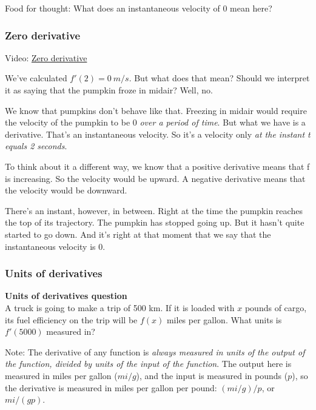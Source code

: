 \documentclass[pdftex, brazil, 12pt, twoside]{article}
\begin{document}
Food for thought: What does an instantaneous velocity of 0 mean here?

\subsubsection{Zero derivative}
\label{u1-what-zero-derivative}

Video: \href{https://www.youtube.com/watch?v=CA56Y0HTb6c}{Zero derivative}

We've calculated $f'(2) = 0\ m/s$.
But what does that mean?
Should we interpret it as saying that the pumpkin froze
in midair?
Well, no.

We know that pumpkins don't behave like that.
Freezing in midair would require the velocity of the pumpkin
to be 0 \emph{over a period of time}.
But what we have is a derivative.
That's an instantaneous velocity.
So it's a velocity only \emph{at the instant t equals 2 seconds}.

To think about it a different way,
we know that a positive derivative
means that f is increasing.
So the velocity would be upward.
A negative derivative means that the velocity would be downward.

There's an instant, however, in between.
Right at the time the pumpkin reaches
the top of its trajectory.
The pumpkin has stopped going up.
But it hasn't quite started to go down.
And it's right at that moment that we
say that the instantaneous velocity is 0.

\subsubsection{Units of derivatives}
\label{u1-what-units}

\begin{exercise}
  \textbf{Units of derivatives question}\\%
  A truck is going to make a trip of 500 km.
  If it is loaded with $x$ pounds of cargo, its fuel efficiency on the trip will be $f(x)$
  miles per gallon. What units is $f'(5000)$ measured in?
\end{exercise}

Note: The derivative of any function is \emph{always measured in units of the output of
the function, divided by units of the input of the function}. The output here is
measured in miles per gallon ($mi/g$), and the input is measured in pounds ($p$),
so the derivative is measured in miles per gallon per pound: $(mi/g)/p$, or
$mi/(gp)$.
\end{document}
